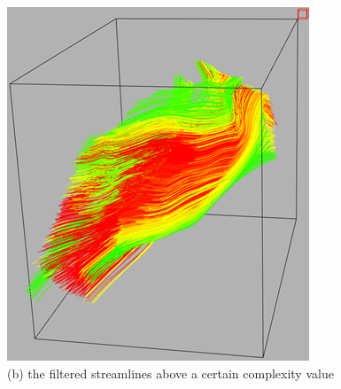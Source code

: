\documentclass{egpubl}
\begin{document}
\begin{figure}[h]
\begin{minipage}{0.30\linewidth}
                        \includegraphics[height = 1.1\linewidth]{Images/filter_vtk.png}\\(b) the filtered streamlines above a certain complexity value \vspace{0.2em}
                \end{minipage}
                \begin{minipage}{0.30\linewidth}
                	\small

\end{minipage}
\end{figure}
\end{document}
